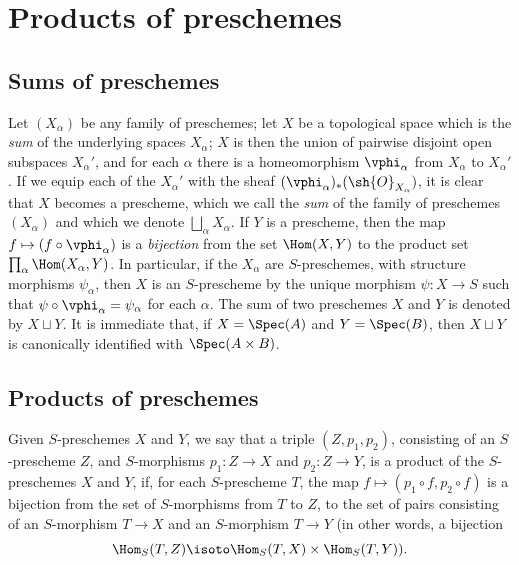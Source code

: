 \section{Products of preschemes}
\label{section:I.3}

\subsection{Sums of preschemes}
\label{subsection:I.3.1}

Let $(X_\alpha)$ be any family of preschemes; let $X$ be a topological space which is the
\emph{sum} of the underlying spaces $X_\alpha$; $X$ is then the union of pairwise
disjoint open subspaces $X_\alpha'$, and for each $\alpha$ there is a homeomorphism
$\vphi_\alpha$ from $X_\alpha$ to $X_\alpha'$. If we equip each of the $X_\alpha'$ with the
sheaf $(\vphi_\alpha)_*(\sh{O}_{X_\alpha})$, it is clear that $X$ becomes a prescheme, which
we call the \emph{sum} of the family of preschemes $(X_\alpha)$ and which we denote
$\bigsqcup_\alpha X_\alpha$. If $Y$ is a prescheme, then the map $f\mapsto(f\circ\vphi_\alpha)$ is a
\emph{bijection} from the set $\Hom(X,Y)$ to the product set $\prod_\alpha\Hom(X_\alpha,Y)$.
In particular, if the $X_\alpha$ are $S$-preschemes, with structure morphisms $\psi_\alpha$, then $X$ is an $S$-prescheme by the unique morphism $\psi:X\to S$ such that
$\psi\circ\vphi_\alpha=\psi_\alpha$ for each $\alpha$. The sum of two preschemes $X$ and $Y$ is denoted by $X\sqcup Y$.
It is immediate that, if $X=\Spec(A)$ and $Y=\Spec(B)$, then $X\sqcup Y$ is canonically identified with $\Spec(A\times B)$.

\subsection{Products of preschemes}
\label{subsection:I.3.2}

\begin{definition}[3.2.1]
\label{I.3.2.1}
Given $S$-preschemes $X$ and $Y$, we say that a triple $(Z,p_1,p_2)$, consisting of an
$S$-prescheme $Z$, and $S$-morphisms $p_1:Z\to X$ and $p_2:Z\to Y$, is a product of the
$S$-preschemes $X$ and $Y$, if, for each $S$-prescheme $T$, the map
$f\mapsto(p_1\circ f,p_2\circ f)$ is a bijection from the set of $S$-morphisms from $T$ to
$Z$, to the set of pairs consisting of an $S$-morphism $T\to X$ and an $S$-morphism $T\to Y$
(in other words, a bijection
\[
  \Hom_S(T,Z)\isoto\Hom_S(T,X)\times\Hom_S(T,Y)).
\]
\end{definition}

